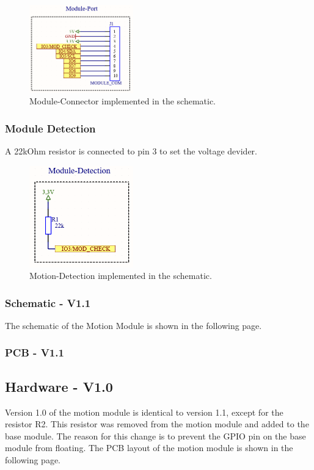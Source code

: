             \begin{figure}[H]
                \centering
                \includegraphics[width=0.4\textwidth]{assets/HW/Motion-Module-Port.png}
                \caption{Module-Connector implemented in the schematic.}
            \end{figure}

        \subsubsection{Module Detection}
            A 22kOhm resistor is connected to pin 3 to set the voltage devider.

            \begin{figure}[H]
                \centering
                \includegraphics[width=0.4\textwidth]{assets/HW/Motion-Module-Check.png}
                \caption{Motion-Detection implemented in the schematic.}
            \end{figure}

        \subsubsection{Schematic - V1.1}
            The schematic of the Motion Module is shown in the following page.
            
            


        \subsubsection{PCB - V1.1}    
           
        
    \subsection {Hardware - V1.0} 
            Version 1.0 of the motion module is identical to version 1.1, except for the resistor R2.
            This resistor was removed from the motion module and added to the base module. The
            reason for this change is to prevent the GPIO pin on the base module from floating. 
            The PCB layout of the motion module is shown in the following page.